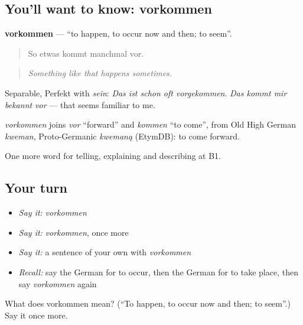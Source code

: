 \subsection*{You'll want to know: vorkommen}
\textbf{vorkommen} — \textquotedblleft{}to happen, to occur now and then; to seem\textquotedblright{}.

\begin{quote}
So etwas kommt manchmal vor.
\end{quote}

\begin{quote}
\emph{Something like that happens sometimes.}
\end{quote}

Separable, Perfekt with \emph{sein}: \emph{Das ist schon oft vorgekommen}. \emph{Das kommt mir bekannt vor} — that seems familiar to me.

\begin{cousinweb}
\emph{vorkommen} joins \emph{vor} \textquotedblleft{}forward\textquotedblright{} and \emph{kommen} \textquotedblleft{}to come\textquotedblright{}, from Old High German \emph{kweman}, Proto-Germanic \emph{kwemaną} (EtymDB): to come forward.
\end{cousinweb}

\begin{grammarlens}[title={What you've built}]
One more word for telling, explaining and describing at B1.
\end{grammarlens}

\subsection*{Your turn}
\begin{itemize}
\raggedright
  \item \emph{Say it:} \emph{vorkommen}
  \item \emph{Say it:} \emph{vorkommen}, once more
  \item \emph{Say it:} a sentence of your own with \emph{vorkommen}
  \item \emph{Recall:} say the German for to occur, then the German for to take place, then say \emph{vorkommen} again
\end{itemize}

\begin{tcolorbox}[breakable,colback=teal!4,colframe=teal!35!black,title={Before you move on}]
What does vorkommen mean? (\textquotedblleft{}To happen, to occur now and then; to seem\textquotedblright{}.) Say it once more.
\end{tcolorbox}
